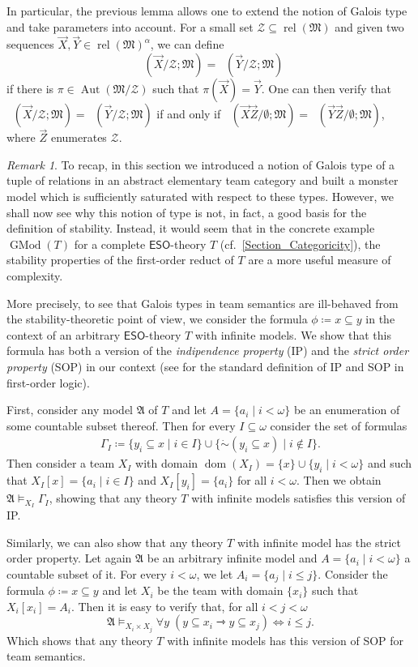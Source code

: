 \documentclass[a4paper]{amsart}
\theoremstyle{definition}
\theoremstyle{remark}
\newtheorem*{remark}{Remark}
\newcommand{\Z}{\mathcal{Z}}
\newcommand{\A}{\mathcal{A}}
\newcommand{\M}{\mathcal{M}}
\DeclareMathOperator{\dom}{dom}
\newcommand{\cneg}{\mathord{\dot{\sim}}}
\newcommand\eso{\mathsf{ESO}}
\DeclareMathOperator{\rel}{rel}
\theoremstyle{definition}
\renewcommand{\A}{\mathfrak{A}}
\renewcommand{\M}{\mathfrak{M}}
\newcommand{\wcimp}{\rightarrowtriangle}
\DeclareMathOperator{\gtype}{tp_g}
\DeclareMathOperator{\Aut}{Aut}
\DeclareMathOperator{\GMod}{GMod}
\begin{document}
In particular, the previous lemma allows one to extend the notion of Galois type and take parameters into account. For a small set $\Z\subseteq\rel(\M)$ and given two sequences $\vec X,\vec Y\in\rel(\M)^\alpha$, we can define 
\[
    \gtype(\vec X/\Z; \M) = \gtype(\vec Y/\Z; \M)
\]
if there is $\pi\in\Aut(\M/\Z)$ such that $\pi(\vec X) = \vec Y$. One can then verify that $\gtype(\vec X/\Z; \M) = \gtype(\vec Y/\Z; \M)$ if and only if $\gtype(\vec X\vec Z/\emptyset; \M) = \gtype(\vec Y\vec Z/\emptyset; \M)$, where $\vec Z$ enumerates $\Z$. 

\begin{remark}
    To recap, in this section we introduced a notion of Galois type of a tuple of relations in an abstract elementary team category and built a monster model which is sufficiently saturated with respect to these types. However, we shall now see why this notion of type is not, in fact, a good basis for the definition of stability. Instead, it would seem that in the concrete example $\GMod(T)$ for a complete $\eso$-theory $T$ (cf.~\cref{Section_Categoricity}), the stability properties of the first-order reduct of $T$ are a more useful measure of complexity.
    
    More precisely, to see that Galois types in team semantics are ill-behaved from the stability-theoretic point of view, we consider the formula $\phi\coloneqq x\subseteq y$ in the context of an arbitrary $\eso$-theory $T$ with infinite models. We show that this formula has both a version of the \emph{indipendence property} (IP) and the \emph{strict order property} (SOP) in our context (see \cite[p.134]{tentziegler} for the standard definition of IP and SOP in first-order logic).

    First, consider any model $\A$ of $T$ and let $A=\{a_i\mid i<\omega \}$ be an enumeration of some countable subset thereof. Then for every  $I\subseteq \omega$ consider the set of formulas
    \begin{align*}
        \Gamma_I\coloneqq\{ y_i\subseteq x \mid i\in I     \} \cup \{\cneg (y_i\subseteq x) \mid i\notin I  \}.
    \end{align*}    
    Then consider a team $X_I$ with domain  $\dom(X_I) = \{x\} \cup\{y_i\mid i<\omega \}$ and such that $X_I[x]=\{a_i\mid i\in I \}$ and $X_I[y_i]=\{a_i\}$ for all $i<\omega$. Then we obtain $\A\models_{X_I} \Gamma_I$, showing that any theory $T$ with infinite models satisfies this version of IP.

    Similarly, we can also show that any theory $T$ with infinite model has the strict order property. Let again $\A$ be an arbitrary infinite model and $A=\{a_i\mid i<\omega \}$ a countable subset of it.  For every $i<\omega$, we let $A_i=\{a_j\mid i\leq j\}$. Consider the formula $\phi\coloneqq x\subseteq y$ and let $X_i$ be the team with domain $\{x_i\}$ such that $X_i[x_i]=A_i$. Then it is easy to verify that, for all $i<j<\omega$
    \[
        \A\models_{X_i\times X_j} \forall  y \; (y\subseteq x_i \wcimp y\subseteq x_j) \iff i\leq j.
    \]
    Which shows that any theory $T$ with infinite models has this version of SOP for team semantics.


\end{remark}
\end{document}

